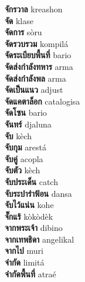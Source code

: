 \textbf{ จักรวาล  } kreashon \\
\textbf{ จัด  } klase \\
\textbf{ จัดการ  } sòru \\
\textbf{ จัดรวบรวม  } kompilá \\
\textbf{ จัดระเบียบพื้นที่  } bario \\
\textbf{ จัดส่งกำลังทหาร  } arma \\
\textbf{ จัดส่งกำลังพล  } arma \\
\textbf{ จัดเป็นแนว  } adjust \\
\textbf{ จัดแคตาล็อก  } catalogisa \\
\textbf{ จัดโซน  } bario \\
\textbf{ จันทร์  } djaluna \\
\textbf{ จับ  } kèch \\
\textbf{ จับกุม  } arestá \\
\textbf{ จับคู่  } acopla \\
\textbf{ จับตัว  } kèch \\
\textbf{ จับประเด็น  } catch \\
\textbf{ จับระบำรำฟ้อน  } dansa \\
\textbf{ จับไว้แน่น  } kohe \\
\textbf{ จั๊กแร้  } kòkòdèk \\
\textbf{ จากพระเจ้า  } dibino \\
\textbf{ จากเทพธิดา  } angelikal \\
\textbf{ จากไป  } muri \\
\textbf{ จำกัด  } limitá \\
\textbf{ จำกัดพื้นที่  } atraé \\
